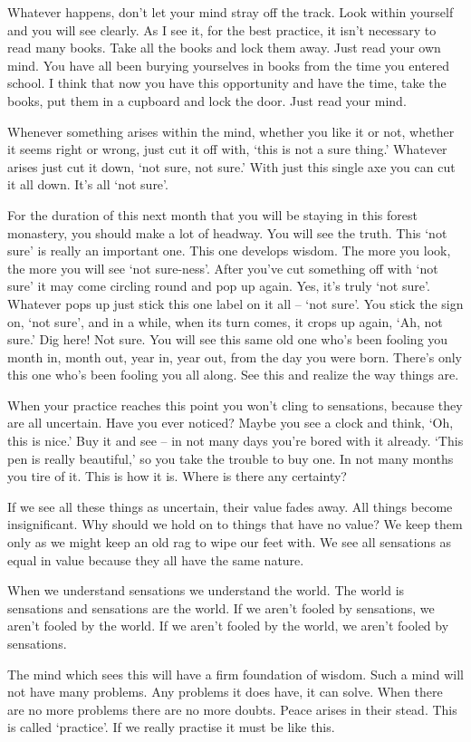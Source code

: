 Whatever happens, don't let your mind stray off the track. Look within yourself and you will see clearly. As I see it, for the best practice, it isn't necessary to read many books. Take all the books and lock them away. Just read your own mind. You have all been burying yourselves in books from the time you entered school. I think that now you have this opportunity and have the time, take the books, put them in a cupboard and lock the door. Just read your mind.

Whenever something arises within the mind, whether you like it or not, whether it seems right or wrong, just cut it off with, `this is not a sure thing.' Whatever arises just cut it down, `not sure, not sure.' With just this single axe you can cut it all down. It's all `not sure'.

For the duration of this next month that you will be staying in this forest monastery, you should make a lot of headway. You will see the truth. This `not sure' is really an important one. This one develops wisdom. The more you look, the more you will see `not sure-ness'. After you've cut something off with `not sure' it may come circling round and pop up again. Yes, it's truly `not sure'. Whatever pops up just stick this one label on it all -- `not sure'. You stick the sign on, `not sure', and in a while, when its turn comes, it crops up again, `Ah, not sure.' Dig here! Not sure. You will see this same old one who's been fooling you month in, month out, year in, year out, from the day you were born. There's only this one who's been fooling you all along. See this and realize the way things are.

When your practice reaches this point you won't cling to sensations, because they are all uncertain. Have you ever noticed? Maybe you see a clock and think, `Oh, this is nice.' Buy it and see -- in not many days you're bored with it already. `This pen is really beautiful,' so you take the trouble to buy one. In not many months you tire of it. This is how it is. Where is there any certainty?

If we see all these things as uncertain, their value fades away. All things become insignificant. Why should we hold on to things that have no value? We keep them only as we might keep an old rag to wipe our feet with. We see all sensations as equal in value because they all have the same nature.

When we understand sensations we understand the world. The world is sensations and sensations are the world. If we aren't fooled by sensations, we aren't fooled by the world. If we aren't fooled by the world, we aren't fooled by sensations.

The mind which sees this will have a firm foundation of wisdom. Such a mind will not have many problems. Any problems it does have, it can solve. When there are no more problems there are no more doubts. Peace arises in their stead. This is called `practice'. If we really practise it must be like this.

